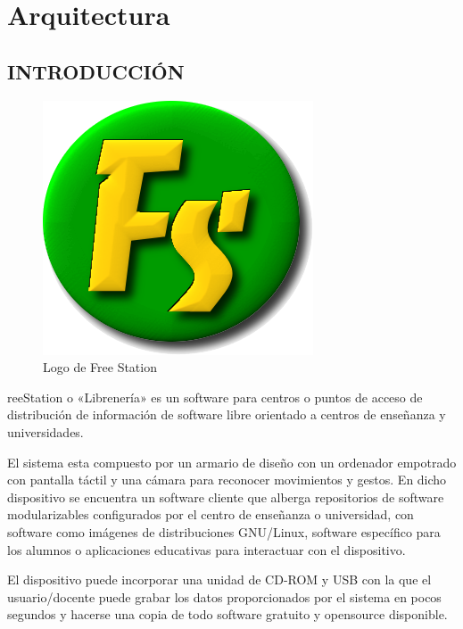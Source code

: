 \cleardoublepage
\chapter{Arquitectura}
\thispagestyle{fancy}

\section{\uppercase{Introducción}}

\begin{figure}[ht]
    \begin{center}
        \includegraphics[scale=0.5]{src/img/fs-logo.png}
        \caption[Logo de Free Station]
          {Logo de Free Station}
    \end{center}
\end{figure}

reeStation o «Librenería» es un software para centros o puntos de
acceso de distribución de información de software libre orientado a centros de enseñanza y
universidades.

El sistema esta compuesto por un armario de diseño con un ordenador empotrado
con pantalla táctil y una cámara para reconocer movimientos y gestos. En dicho
dispositivo se encuentra un software cliente que alberga repositorios de
software modularizables configurados por el centro de enseñanza o universidad,
con software como imágenes de distribuciones GNU/Linux, software específico
para los alumnos o aplicaciones educativas para interactuar con el
dispositivo.

El dispositivo puede incorporar una unidad de CD-ROM y USB con la que el
usuario/docente puede grabar los datos proporcionados por el sistema en pocos
segundos y hacerse una copia de todo software gratuito y opensource disponible.

